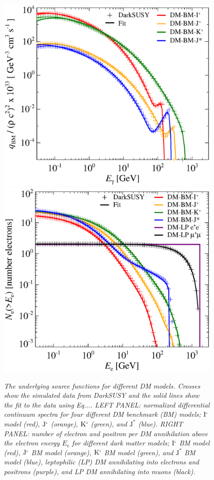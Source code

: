 \documentclass[10pt,aps,pra,reprint,amsmath,amsfonts,amssymb,showpacs]{revtex4-1}
\newcommand{\rmn}{\mathrm}
\newcommand{\ee}{E_\rmn{e}}
\newcommand{\Km}{\rmn{K}`}
\newcommand{\Imm}{\rmn{I}`}
\newcommand{\Jm}{\rmn{J}^*}
\newcommand{\Jmm}{\rmn{J}`}
\begin{document}
\vspace{-0.7cm}

%
%

\clearpage
\appendix

\begin{figure}
\begin{minipage}{2.0\columnwidth}
 \includegraphics[width=0.49\columnwidth]{figures/fit.ds.flux.eps}
 \includegraphics[width=0.49\columnwidth]{figures/fit.epflux.int.eps}
\caption{\it The underlying source functions for different DM
  models. Crosses show the simulated data from DarkSUSY and the solid
  lines show the fit to the data using Eq.... LEFT PANEL: normalized
  differential continuum spectra for four different DM benchmark (BM)
  models; $\Imm$ model (red), $\Jmm$ (orange), $\Km$ (green), and
  $\Jm$ (blue). RIGHT PANEL: number of electron and positron per DM
  annihilation above the electron energy $\ee$ for different dark
  matter models; $\Imm$ BM model (red), $\Jmm$ BM model (orange),
  $\Km$ BM model (green), and $\Jm$ BM model (blue), leptophilic (LP)
  DM annihilating into electrons and positrons (purple), and LP DM
  annihilating into muons (black).}
 \label{fig17}
\end{minipage}
\end{figure}
\end{document}
